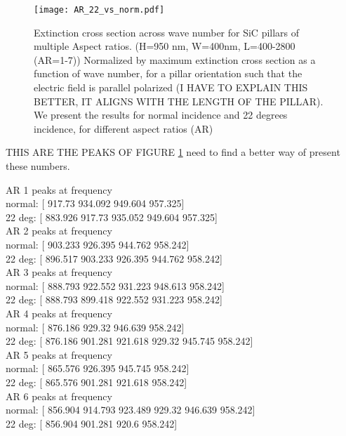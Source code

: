 \begin{figure}
    \centering
    \texttt{[image: AR\_22\_vs\_norm.pdf]} 
    \caption{ Extinction cross section across wave number for SiC pillars of multiple Aspect ratios. 
             (H=950 nm, W=400nm, L=400-2800 (AR=1-7))
            Normalized by maximum extinction cross section as a function of wave number,
            for a pillar orientation such that the electric field is parallel polarized 
            (I HAVE TO EXPLAIN THIS BETTER, IT ALIGNS WITH THE LENGTH OF THE PILLAR). 
            We present the results for normal incidence and 22 degrees incidence, 
            for different aspect ratios (AR)
            }
    \label{fig:AR_22_vs_norm}
 \end{figure}

THIS ARE THE PEAKS OF FIGURE \ref{fig:AR_22_vs_norm} need to find a better way of 
present these numbers. 

AR 1 peaks at frequency\\
normal: [ {\color{green}917.73} 934.092 949.604 957.325]\\
22 deg: [ {\color{red}883.926} {\color{green}917.73} 935.052 949.604 957.325]\\

AR 2 peaks at frequency\\
normal: [ {\color{green}903.233} 926.395 944.762 958.242]\\
22 deg: [ {\color{red}896.517} {\color{green}903.233} 926.395 944.762 958.242]\\

AR 3 peaks at frequency\\
normal: [ {\color{green}888.793} 922.552 931.223 948.613 958.242]\\
22 deg: [ {\color{green}888.793} 899.418 922.552 931.223 958.242]\\

AR 4 peaks at frequency\\
normal: [ {\color{green}876.186} 929.32 946.639 958.242]\\
22 deg: [ {\color{green}876.186} 901.281 921.618 929.32 945.745 958.242]\\

AR 5 peaks at frequency\\
normal: [ {\color{green}865.576} 926.395 945.745 958.242]\\
22 deg: [ {\color{green}865.576} 901.281 921.618 958.242]\\

AR 6 peaks at frequency\\
normal: [ {\color{green}856.904} 914.793 923.489 929.32 946.639 958.242]\\
22 deg: [ {\color{green}856.904} 901.281 920.6 958.242]\\

